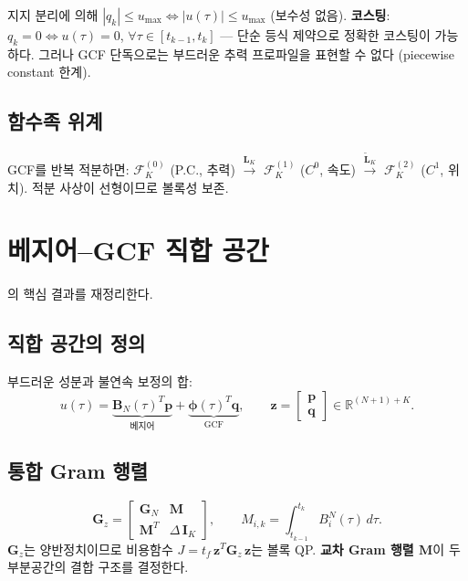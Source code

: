 \documentclass[11pt]{article}
\begin{document}
지지 분리에 의해
$|q_k| \le u_{\max} \Leftrightarrow |u(\tau)| \le u_{\max}$
(보수성 없음).
\textbf{코스팅}: $q_k = 0 \Leftrightarrow u(\tau) = 0$, $\forall \tau \in [t_{k-1}, t_k]$
--- 단순 등식 제약으로 정확한 코스팅이 가능하다.
그러나 GCF 단독으로는 부드러운 추력 프로파일을 표현할 수 없다 (piecewise constant 한계).

\subsection{함수족 위계}

GCF를 반복 적분하면: $\mathcal{F}_K^{(0)}$ (P.C., 추력)
$\xrightarrow{\mathbf{L}_K}$ $\mathcal{F}_K^{(1)}$ ($C^0$, 속도)
$\xrightarrow{\tilde{\mathbf{L}}_K}$ $\mathcal{F}_K^{(2)}$ ($C^1$, 위치).
적분 사상이 선형이므로 볼록성 보존.


\section{베지어--GCF 직합 공간}
\label{sec:direct_sum}

\cite{efc003}의 핵심 결과를 재정리한다.

\subsection{직합 공간의 정의}

부드러운 성분과 불연속 보정의 합:
\begin{equation}\label{eq:direct_sum}
  u(\tau) = \underbrace{\mathbf{B}_N(\tau)^T \mathbf{p}}_{\text{베지어}}
  + \underbrace{\boldsymbol{\phi}(\tau)^T \mathbf{q}}_{\text{GCF}},
  \qquad
  \mathbf{z} = \begin{bmatrix} \mathbf{p} \\ \mathbf{q} \end{bmatrix}
  \in \mathbb{R}^{(N{+}1)+K}.
\end{equation}

\subsection{통합 Gram 행렬}

\begin{equation}\label{eq:Gz}
  \mathbf{G}_z = \begin{bmatrix}
    \mathbf{G}_N & \mathbf{M} \\
    \mathbf{M}^T & \Delta\, \mathbf{I}_K
  \end{bmatrix},
  \qquad
  M_{i,k} = \int_{t_{k-1}}^{t_k} B_i^N(\tau)\, d\tau.
\end{equation}
$\mathbf{G}_z$는 양반정치이므로 비용함수 $J = t_f\, \mathbf{z}^T \mathbf{G}_z\, \mathbf{z}$는 볼록 QP.
\textbf{교차 Gram 행렬 $\mathbf{M}$}이 두 부분공간의 결합 구조를 결정한다.
\end{document}
